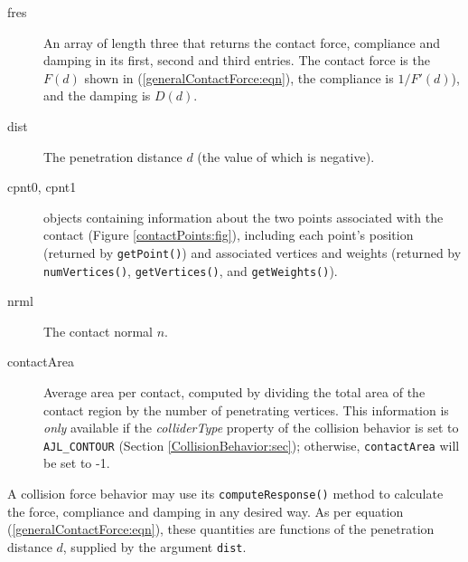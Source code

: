 \begin{description}

\item[fres]\mbox{}

An array of length three that returns the contact force, compliance
and damping in its first, second and third entries. The contact force
is the $F(d)$ shown in (\ref{generalContactForce:eqn}), the compliance
is $1/F'(d)$), and the damping is $D(d)$.

\item[dist]\mbox{}

The penetration distance $d$ (the value of which is negative).

\item[cpnt0, cpnt1]\mbox{}

 objects
containing information about the two points associated with the
contact (Figure \ref{contactPoints:fig}), including each point's
position (returned by {\tt getPoint()}) and associated vertices and
weights (returned by {\tt numVertices()}, {\tt getVertices()}, and
{\tt getWeights()}).

\item[nrml]\mbox{} 

The contact normal $n$.

\item[contactArea]\mbox{}

Average area per contact, computed by dividing the total area of the
contact region by the number of penetrating vertices.  This
information is {\it only} available if the {\it colliderType} property
of the collision behavior is set to {\tt AJL\_CONTOUR} (Section
\ref{CollisionBehavior:sec}); otherwise, {\tt contactArea}
will be set to -1.

\end{description}

A collision force behavior may use its {\tt computeResponse()} method
to calculate the force, compliance and damping in any desired way. As
per equation (\ref{generalContactForce:eqn}), these quantities are
functions of the penetration distance $d$, supplied by the argument
{\tt dist}.

